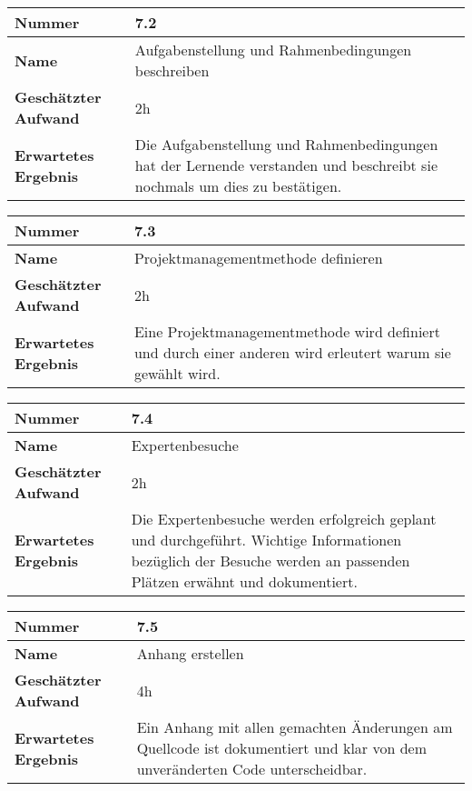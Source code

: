 \begin{longtable}{p{}|p{}}
	\hline
	\textbf{Nummer}                 & \textbf{7.2}            \\
	\hline
	\textbf{Name}   				& Aufgabenstellung und Rahmenbedingungen beschreiben                  \\
	\hline
	\textbf{Geschätzter Aufwand}    & 2h                                    \\
	\hline
	\textbf{Erwartetes Ergebnis}    & Die Aufgabenstellung und Rahmenbedingungen hat der Lernende verstanden und beschreibt sie nochmals um dies zu bestätigen.                                    \\
	\hline
\end{longtable}\label{tab:rahmenaufgaben-7.2}

\begin{longtable}{p{}|p{}}
	\hline
	\textbf{Nummer}                 & \textbf{7.3}            \\
	\hline
	\textbf{Name}   				& Projektmanagementmethode definieren                  \\
	\hline
	\textbf{Geschätzter Aufwand}    & 2h                                    \\
	\hline
	\textbf{Erwartetes Ergebnis}    & Eine Projektmanagementmethode wird definiert und durch einer anderen wird erleutert warum sie gewählt wird.                                    \\
	\hline
\end{longtable}\label{tab:rahmenaufgaben-7.3}

\begin{longtable}{p{}|p{}}
	\hline
	\textbf{Nummer}                 & \textbf{7.4}            \\
	\hline
	\textbf{Name}   				& Expertenbesuche                  \\
	\hline
	\textbf{Geschätzter Aufwand}    & 2h                                    \\
	\hline
	\textbf{Erwartetes Ergebnis}    & Die Expertenbesuche werden erfolgreich geplant und durchgeführt. Wichtige Informationen bezüglich der Besuche werden an passenden Plätzen erwähnt und dokumentiert.                                    \\
	\hline
\end{longtable}\label{tab:rahmenaufgaben-7.4}

\begin{longtable}{p{}|p{}}
	\hline
	\textbf{Nummer}                 & \textbf{7.5}            \\
	\hline
	\textbf{Name}   				& Anhang erstellen                  \\
	\hline
	\textbf{Geschätzter Aufwand}    & 4h                                    \\
	\hline
	\textbf{Erwartetes Ergebnis}    & Ein Anhang mit allen gemachten Änderungen am Quellcode ist dokumentiert und klar von dem unveränderten Code unterscheidbar.                                    \\
	\hline
\end{longtable}\label{tab:rahmenaufgaben-7.5}

\newpage